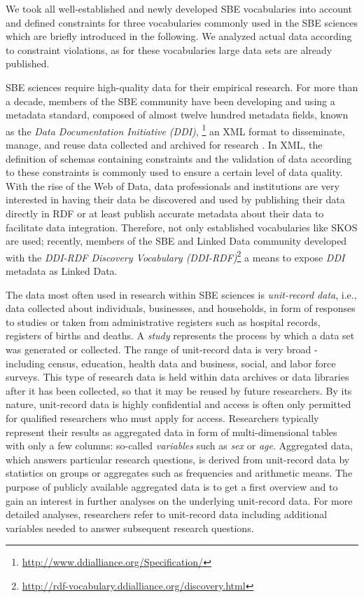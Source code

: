 \documentclass{llncs}
\begin{document}
We took all well-established and newly developed SBE vocabularies into account and defined constraints for three vocabularies commonly used in the SBE sciences which are briefly introduced in the following. We analyzed actual data according to constraint violations, as for these vocabularies large data sets are already published.

SBE sciences require high-quality data for their empirical research. For more than a decade, members of the SBE community have been developing and using a
metadata standard, composed of almost twelve hundred metadata fields, known as the \emph{Data Documentation Initiative (DDI)}, \footnote{\url{http://www.ddialliance.org/Specification/}}
an XML format to disseminate, manage,
and reuse data collected and archived for research \cite{Vardigan2008}. 
In XML, the definition of schemas containing constraints and the validation of data according to these constraints is commonly used to ensure a certain level of data quality.
With the rise of the Web of Data, data professionals and institutions are very interested in having their data be discovered and used by publishing their data directly in RDF or at least publish accurate metadata about their data to facilitate data integration. Therefore, not only established vocabularies like SKOS are used; 
recently, members of the SBE and Linked Data community developed with the \emph{DDI-RDF Discovery Vocabulary (DDI-RDF)}\footnote{\url{http://rdf-vocabulary.ddialliance.org/discovery.html}} a means to expose \emph{DDI} metadata as Linked Data. 

The data most often used in research within SBE sciences is \emph{unit-record data}, i.e., data collected about individuals, businesses, and households, in form of responses to studies or taken from administrative registers such as hospital records, registers of births and deaths. A \emph{study} represents the process by which a data set was generated or collected. The range of unit-record data is very broad - including census, education, health data and business, social, and labor force surveys. This type of research data is held within data archives or data libraries after it has been collected, so that it may be reused by future researchers. By its nature, unit-record data is highly confidential and access is often only permitted for qualified researchers who must apply for access. Researchers typically represent their results as aggregated data in form of multi-dimensional tables with only a few columns: so-called \emph{variables} such as \emph{sex} or \emph{age}. Aggregated data, which answers particular research questions, is derived from unit-record data by statistics on groups or aggregates such as frequencies and arithmetic means. The purpose of publicly available aggregated data is to get a first overview and to gain an interest in further analyses on the underlying unit-record data. For more detailed analyses, researchers refer to unit-record data including additional variables needed to answer subsequent research questions. 
\end{document}
